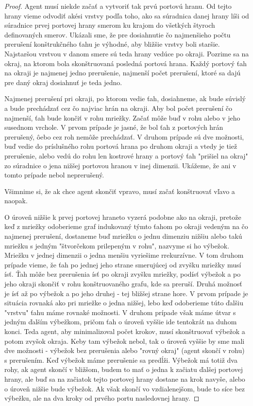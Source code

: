 \begin{proof}
Agent musí niekde začať a vytvoriť tak prvú portovú hranu. Od tejto hrany
vieme odvodiť akési vrstvy podľa toho, ako sa súradnica danej hrany líši od
súradnice prvej portovej hrany smerom ku krajom do všetkých štyroch 
definovaných smerov.
Ukázali sme, že pre dosiahnutie čo najmenšieho počtu prerušení konštrukčného
ťahu je výhodné, aby bližšie vrstvy boli staršie. Najstaršou vrstvou v danom
smere sú teda hrany vedúce po okraji. Pozrime sa na okraj, na ktorom bola
skonštruovaná posledná portová hrana. Každý portový ťah na okraji je
najmenej jedno prerušenie, najmenší počet prerušení, ktoré sa dajú pre daný
okraj dosiahnuť je teda jedno.

Najmenej prerušení pri okraji, po ktorom vedie ťah, dosiahneme, ak bude
súvislý a bude prechádzať cez čo najviac hrán na okraji. Aby bol počet
prerušení čo najmenší, ťah bude končiť v rohu mriežky. Začať môže buď v rohu
alebo v jeho susednom vrchole. V prvom prípade je jasné, že bol ťah z
portových hrán prerušený, ôebo cez roh nemôže prechádzať. V druhom prípade
sú dve možnosti, buď vedie do príslušného rohu portová hrana po druhom
okraji a vtedy je tiež prerušenie, alebo vedú do rohu len kostrové hrany a
portový ťah "prišiel na okraj" zo súradnice o jena nižšej portovou hranou v
inej dimenzii. Ukážeme, že ani v tomto prípade nebol neprerušený.

Všimnime si, že ak chce agent skončiť vpravo, musí začať konštruovať vľavo a
naopak.

O úroveň nižšie k prvej portovej hraneto vyzerá podobne ako na okraji,
pretože keď z mriežky odoberieme graf indukovaný týmto ťahom po okraji
vedeným na čo najmenej prerušení, dostaneme buď mriežku o jednu dimenziu
nižšiu alebo takú mriežku s jedným "štvorčekom prilepeným v rohu", nazvyme
si ho výbežok. Mriežku v
jednej dimenzii o jedna menšiu vyriešime rrekurzívne. V tom druhom prípade
vieme, že ťah  po jednej jeho
strane smerujúcej od zvyšku mriežky musí ísť. Ťah môže bez prerušenia ísť po
okraji zvyšku mriežky, podísť výbežok a po jeho okraji skončiť v rohu
konštruovaného grafu, kde sa preruší. Druhá možnosť je ísť až po výbežok a
po jeho druhej - tej bližšej strane hore. V prvom prípade je situácia
rovnaká ako pri mriežke o jedna nižšej, lebo keď odoberieme túto ďalšiu
"vrstvu" ťahu máme rovnaké možnosti. V druhom prípade však máme útvar s
jedným ďalším výbežkom, pričom ťah o úroveň vyššie ide tentokrát na duhom
konci. Teda agent, aby minimalizoval počet krokov, musí skonštruovať výbežok 
a potom zvyšok okraja. Keby tam výbežok nebol, tak o úroveň vyššie by sme
mali dve možnosti - výbežok bez prerušenia alebo "rovný okraj" (agent skončí
v rohu) s prerušením. Keď výbežok máme prerušenie sa predĺži. Výbežok má
totiž dva rohy, ak agent skončí v bližšom, budem to mať o jedna k začiatu
ďalšej portovej hrany, ale buď sa na začiatok tejto portovej hrany dostane
na krok navyše, alebo o úroveň nižšie bude výbežok. Ak však skončí vo
vzdialenejšom, bude to síce bez výbežku, ale na dva kroky od prvého portu
nasledovnej hrany.


\end{proof}

